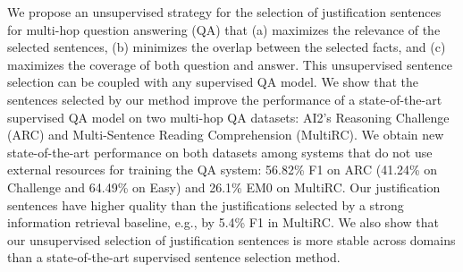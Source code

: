 We propose an unsupervised strategy for the selection of justification sentences for multi-hop question answering (QA) that 
(a) maximizes the relevance of the selected sentences,
(b) minimizes the overlap between the selected facts, and 
(c) maximizes the coverage of both question and answer. 
This unsupervised sentence selection can be coupled with any supervised QA model. We show that the sentences selected by our method improve the performance of a state-of-the-art supervised QA model on two multi-hop QA datasets: AI2's Reasoning Challenge (ARC) and Multi-Sentence Reading Comprehension (MultiRC). We obtain new state-of-the-art performance on both datasets among systems that do not use external resources for training the QA system: 56.82\% F1 on ARC (41.24\% on Challenge and 64.49\% on Easy) and 26.1\% EM0 on MultiRC. Our justification sentences have higher quality than the justifications selected by a strong information retrieval baseline, e.g., by 5.4\% F1 in MultiRC. We also show that our unsupervised selection of justification sentences is more stable across domains than a state-of-the-art supervised sentence selection method.